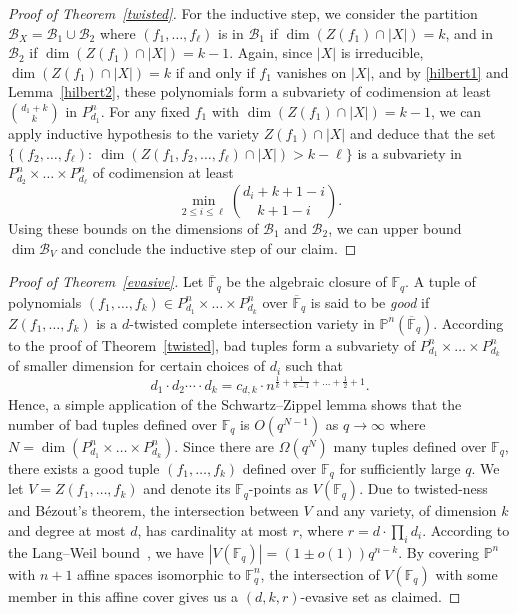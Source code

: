 \documentclass[11pt]{article}
\theoremstyle{definition}
\begin{document}
\begin{proof}[Proof of Theorem~\ref{twisted}]
    For the inductive step, we consider the partition $\mathcal{B}_X = \mathcal{B}_1 \cup \mathcal{B}_2$ where $(f_1,\ldots,f_\ell)$ is in $\mathcal{B}_1$ if $\dim ( Z(f_1) \cap |X| ) = k$, and in $\mathcal{B}_2$ if $\dim ( Z(f_1) \cap |X| ) = k - 1$. Again, since $|X|$ is irreducible, $\dim ( Z(f_1) \cap |X| ) = k$ if and only if $f_1$ vanishes on $|X|$, and by \eqref{hilbert1} and Lemma~\ref{hilbert2}, these polynomials form a subvariety of codimension at least $\binom{d_1 + k}{k}$ in $P^n_{d_1}$. For any fixed $f_1$ with $\dim ( Z(f_1) \cap |X| ) = k - 1$, we can apply inductive hypothesis to the variety $Z(f_1) \cap |X|$ and deduce that the set $\{ (f_2,\dots,f_\ell):~ \dim ( Z(f_1,f_2,\dots,f_\ell) \cap |X| )> k -\ell \}$ is a subvariety in $P^{n}_{d_2}\times\dots\times P^n_{d_\ell}$ of codimension at least \begin{equation*}
            \min_{2\leq i\leq \ell} \binom{d_i+k+1-i}{k+1-i}.
    \end{equation*} Using these bounds on the dimensions of $\mathcal{B}_1$ and $\mathcal{B}_2$, we can upper bound $\dim \mathcal{B}_V$ and conclude the inductive step of our claim. %
\end{proof}

\begin{proof}[Proof of Theorem~\ref{evasive}]
    Let $\overline{\mathbb{F}}_q$ be the algebraic closure of $\mathbb{F}_q$. A tuple of polynomials $(f_1,\ldots,f_k)\in P^n_{d_1}\times\dots\times P^n_{d_k}$ over $\overline{\mathbb{F}}_q$ is said to be \textit{good} if $Z(f_1,\dots,f_k)$ is a $d$-twisted complete intersection variety in $\mathbb{P}^n(\overline{\mathbb{F}}_q)$. According to the proof of Theorem~\ref{twisted}, bad tuples form a subvariety of $P^n_{d_1}\times\dots\times P^n_{d_k}$ of smaller dimension for certain choices of $d_i$ such that \begin{equation*}
        d_1 \cdot d_2 \cdots \cdot d_k = c_{d,k} \cdot n^{\frac{1}{k} + \frac{1}{k-1} + \dots + \frac{1}{2} + 1}.
    \end{equation*} Hence, a simple application of the Schwartz--Zippel lemma \cite{DeMilloLipton1978,Zippel1979,Schwartz1980} shows that the number of bad tuples defined over $\mathbb{F}_q$ is $O(q^{N-1})$ as $q \to \infty$ where $N = \dim(P^n_{d_1}\times\dots\times P^n_{d_k})$. Since there are $\Omega(q^N)$ many tuples defined over $\mathbb{F}_q$, there exists a good tuple $(f_1,\ldots,f_k)$ defined over $\mathbb{F}_q$ for sufficiently large $q$. We let $V = Z(f_1,\dots,f_k)$ and denote its $\mathbb{F}_q$-points as $V(\mathbb{F}_q)$. Due to twisted-ness and Bézout's theorem, the intersection between $V$ and any variety, of dimension $k$ and degree at most $d$, has cardinality at most $r$, where $r = d\cdot\prod_id_i$. According to the Lang--Weil bound~\cite{lang1954number}, we have $|V(\mathbb{F}_q)| = (1 \pm o(1))q^{n-k}$. By covering $\mathbb{P}^n$ with $n+1$ affine spaces isomorphic to $\mathbb{F}_q^n$, the intersection of $V(\mathbb{F}_q)$ with some member in this affine cover gives us a $(d,k,r)$-evasive set as claimed.
\end{proof}
\end{document}

